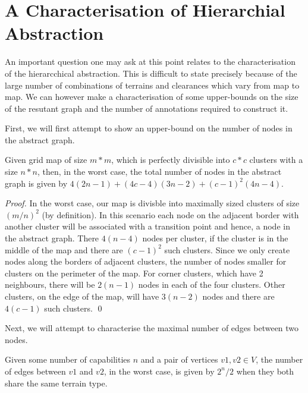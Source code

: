 \section{A Characterisation of Hierarchial Abstraction}
An important question one may ask at this point relates to the characterisation of the hierarcchical abstraction. This is difficult to state precisely because of the large number of combinations of terrains and clearances which vary from map to map. We can however make a characterisation of some upper-bounds on the size of the resutant graph and the number of annotations required to construct it. \\ \newline

First, we will first attempt to show an upper-bound on the number of nodes in the abstract graph. 
\begin{lemma}
\label{aha-lemma:maxnodes}
Given grid map of size $m*m$, which is perfectly divisible into $c*c$ clusters with a size $n*n$, then, in the worst case, the total number of nodes in the abstract graph is given by $4(2n-1) + (4c - 4)(3n-2) + (c-1)^2(4n-4)$.
\end{lemma}

\begin{proof}
In the worst case, our map is divisble into maximally sized clusters of size $(m/n)^2$ (by definition). In this scenario each node on the adjacent border with another cluster will be associated with a transition point and hence, a node in the abstract graph.
There $4(n-4)$ nodes per cluster, if the cluster is in the middle of the map and there are $(c-1)^2$ such clusters. Since we only create nodes along the borders of adjacent clusters, the number of nodes smaller for clusters on the perimeter of the map. For corner clusters, which have 2 neighbours, there will be $2(n-1)$ nodes in each of the four clusters. Other clusters, on the edge of the map, will have $3(n-2)$ nodes and there are $4(c-1)$ such clusters. \qed
\end{proof}

Next, we will attempt to characterise the maximal number of edges between two nodes.
\begin{lemma}
\label{aha-lemma:maxedges}
Given some number of capabilities $n$ and a pair of vertices $v1, v2 \in V$, the number of edges between $v1$ and $v2$, in the worst case, is given by $2^n/2$ when they both share the same terrain type.
\end{lemma}

